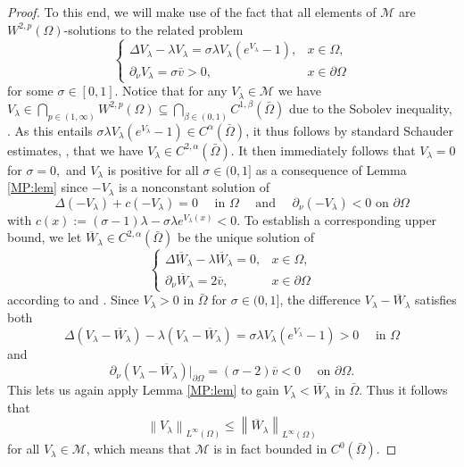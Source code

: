 \documentclass[12pt,a4paper]{amsart}
\theoremstyle{definition}
\theoremstyle{remark}
\numberwithin{equation}{section}
\numberwithin{theorem}{section}
\newcommand{\normA}[2][]{\left\lVert #2 \right\rVert_{#1}}
\begin{document}
\begin{proof}
To this end, we will make use of the fact that all elements of $\mathcal{M}$ are  $W^{2,p}(\Omega)$-solutions to the related problem
\begin{equation}\label{loc:nlin:aux}
  \left\{\begin{array}{lr}
  \Delta V_{\lambda}-\lambda V_{\lambda}=\sigma\lambda  V_{\lambda} (e^{V_{\lambda}}-1),& x\in\Omega,\\
  \partial_\nu V_{\lambda}=\sigma\bar{v}>0,& x\in\partial\Omega
  \end{array}\right.
\end{equation}
for some $\sigma \in [0,1]$. Notice that for any $V_\lambda\in\mathcal{M}$ we have $V_\lambda \in \bigcap_{p\in(1,\infty)}W^{2,p}(\Omega) \subseteq \bigcap_{\beta \in (0,1)} C^{1,\beta}(\bar\Omega)$ due to the Sobolev inequality, \cite[Section 5.6.3]{Evans}. As this entails $\sigma\lambda V_{\lambda}(e^{V_{\lambda}}-1)\in C^{\alpha}(\bar\Omega)$, it thus follows by standard Schauder estimates, \cite{GNa}, that we have $V_{\lambda}\in C^{2,\alpha}(\bar{\Omega})$. It then immediately follows that $V_{\lambda}=0$ for $\sigma=0,$ and $V_{\lambda}$ is positive for all $\sigma \in (0,1]$ as a consequence of Lemma \ref{MP:lem}   since $-V_{\lambda}$ is a nonconstant solution of
$$
\Delta (- V_{\lambda}) + c (- V_{\lambda})=0\quad\text{ in }\Omega \quad\text{ and }\quad \partial_\nu (- V_{\lambda}) < 0 \text{ on }\partial\Omega
$$
with $c(x):=(\sigma -1)\lambda -\sigma\lambda e^{ V_{\lambda}(x)}<0$. To establish a corresponding upper bound, we let $\overline{W}_\lambda\in C^{2,\alpha}(\bar{\Omega})$ be the unique solution of  
\begin{equation}\label{supsol}
  \left\{\begin{array}{lr}
  \Delta \overline{W}_{\lambda}-\lambda \overline{W}_{\lambda}= 0,& x\in\Omega,\\
  \partial_\nu \overline{W}_{\lambda}=2\bar{v},& x\in\partial\Omega
  \end{array}\right.
\end{equation}
according to \cite[Theorem 2.4.2.7]{Grisvard} and \cite{GNa}.
Since $V_{\lambda}> 0$ in $\bar{\Omega}$ for $\sigma\in(0,1]$, the difference $V_{\lambda}-\overline{W}_{\lambda}$ satisfies both
$$
\Delta ( V_{\lambda}-\overline{W}_{\lambda}) -\lambda ( V_{\lambda}-\overline{W}_{\lambda})=\sigma\lambda  V_{\lambda}(e^{V_{\lambda}}-1)>0 \quad \text{ in }\Omega
$$
and 
$$
	\partial_\nu (V_{\lambda}-\overline{W}_{\lambda})|_{\partial\Omega} = (\sigma - 2)\overline{v} < 0\quad \text{ on } \partial \Omega.
$$
This lets us again apply Lemma \ref{MP:lem} to gain $V_{\lambda} < \overline{W}_\lambda$ in $\bar\Omega$. Thus it follows that $$
  \normA[L^\infty(\Omega)]{ V_{\lambda}} \leq \normA[L^\infty(\Omega)]{\overline{W}_{\lambda}}
$$ for all $V_{\lambda} \in \mathcal{M}$, which means that $\mathcal{M}$ is in fact bounded in $C^0(\bar{\Omega})$.


\end{proof}
\end{document}
